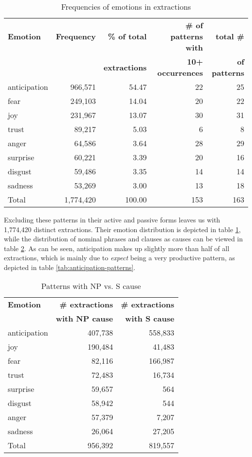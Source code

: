 \begin{table}[h]
\centering
\begin{tabular}{l|r|r|r|r}
{\bf Emotion} & {\bf Frequency} & {\bf\% of total} & {\bf\# of patterns with} & {\bf total \#} \\
& & {\bf extractions} & {\bf 10+ occurrences} & {\bf of patterns}\\\hline
anticipation  & 966,571 & 54.47 & 22 & 25\\
fear          & 249,103 & 14.04 & 20 & 22\\
joy           & 231,967 & 13.07 & 30 & 31\\
trust         & 89,217  & 5.03  &  6 & 8\\
anger         & 64,586  & 3.64  & 28 & 29\\
surprise      & 60,221  & 3.39  & 20 & 16\\
disgust       & 59,486  & 3.35  & 14 & 14\\
sadness       & 53,269  & 3.00  & 13 & 18\\\hline
Total         & 1,774,420 & 100.00 & 153 & 163              
\end{tabular}
\caption{Frequencies of emotions in extractions}
\label{tab:extraction-emotion-freq}
\end{table}

Excluding these patterns in their active and passive forms leaves us with 1,774,420 distinct extractions. Their emotion distribution is depicted in table \ref{tab:extraction-emotion-freq}, while the distribution of nominal phrases and clauses as causes can be viewed in table \ref{tab:patterns-np-vs-s}. As can be seen, anticipation makes up slightly more than half of all extractions, which is mainly due to \textit{expect} being a very productive pattern, as depicted in table \ref{tab:anticipation-patterns}.

\begin{table}[h]
\centering
\begin{tabular}{l|r|r}
{\bf Emotion} & {\bf \# extractions} & {\bf \# extractions} \\
{\bf }        & {\bf with NP cause}         & {\bf with S cause}          \\\hline
anticipation  & 407,738 & 558,833                \\
joy           & 190,484 & 41,483                 \\
fear          & 82,116 & 166,987                \\
trust         & 72,483 & 16,734                 \\
surprise      & 59,657 & 564                    \\
disgust       & 58,942 & 544                    \\
anger         & 57,379 & 7,207                  \\
sadness       & 26,064 & 27,205                 \\\hline
Total         & 956,392 &	819,557
\end{tabular}
\caption{Patterns with NP vs. S cause}
\label{tab:patterns-np-vs-s}
\end{table}

